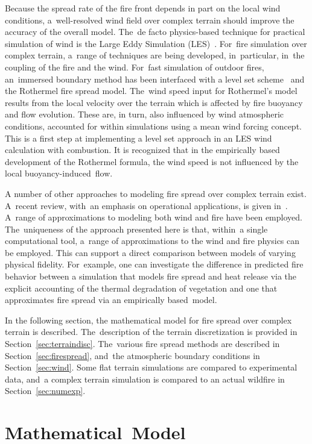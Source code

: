\documentclass[atmosphere,article,accept,moreauthors,pdftex]{Definitions/mdpi}
\begin{document}
Because the spread rate of the fire front depends in part on the local wind conditions, a~well-resolved wind field over complex terrain should improve the accuracy of the overall model. The~de facto physics-based technique for practical simulation of wind is the Large Eddy Simulation (LES)~\cite{Linn:2007,coen_2013,Mell:IJWF2007}. For~fire simulation over complex terrain, a~range of techniques are being developed, in~particular, in~the coupling of the fire and the wind. For~fast simulation of outdoor fires, an~immersed boundary method has been interfaced with a level set scheme~\cite{Bova:IJWF2015} and the Rothermel fire spread model. The~wind speed input for Rothermel's model results from the local velocity over the terrain which is affected by fire buoyancy and flow evolution. These are, in turn, also influenced by wind atmospheric conditions, accounted for within simulations using a mean wind forcing concept. This is a first step at implementing a level set approach in an LES wind calculation with combustion. It is recognized that in the empirically based development of the Rothermel formula, the wind speed is not influenced by the local buoyancy-induced~flow.

A number of other approaches to modeling fire spread over complex terrain exist. A~recent review, with~an emphasis on operational applications, is given in~\cite{Arca_2019}. A~range of approximations to modeling both wind and fire have been employed. The~uniqueness of the approach presented here is that, within~a single computational tool, a~range of approximations to the wind and fire physics can be employed. This can support a direct comparison between models of varying physical fidelity. For~example, one can investigate the difference in predicted fire behavior between a simulation that models fire spread and heat release via the explicit accounting of the thermal degradation of vegetation and one that approximates fire spread via an empirically based~model. 

In the following section, the mathematical model for fire spread over complex terrain is described. The~description of the terrain discretization is provided in Section~\ref{sec:terraindisc}. The~various fire spread methods are described in Section~\ref{sec:firespread}, and~the atmospheric boundary conditions in Section~\ref{sec:wind}. Some flat terrain simulations are compared to experimental data, and~a complex terrain simulation is compared to an actual wildfire in Section~\ref{sec:numexp}. 


\section{Mathematical~Model} \label{sec:matmodel}
\unskip
\end{document}
